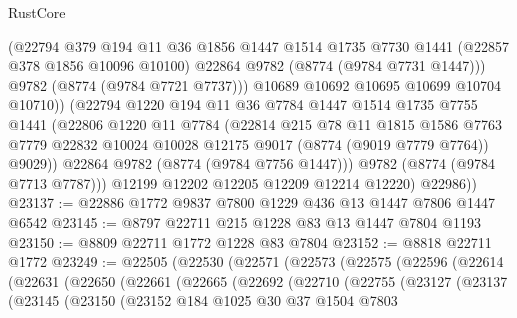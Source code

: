 \begin{lexlean}{RustCore}
\begin{coremodule}
                  (@22794
                    @379
                    @194
                    @11
                    @36
                    @1856
                    @1447
                    @1514
                    @1735
                    @7730
                    @1441
                    (@22857 @378 @1856 @10096 @10100)
                    @22864
                    @9782
                    (@8774 (@9784 @7731 @1447)))
                  @9782
                  (@8774 (@9784 @7721 @7737)))
                @10689
                @10692
                @10695
                @10699
                @10704
                @10710))
            (@22794
              @1220
              @194
              @11
              @36
              @7784
              @1447
              @1514
              @1735
              @7755
              @1441
              (@22806
                @1220
                @11
                @7784
                (@22814
                  @215
                  @78
                  @11
                  @1815
                  @1586
                  @7763
                  @7779
                  @22832
                  @10024
                  @10028
                  @12175
                  @9017
                  (@8774 (@9019 @7779 @7764))
                  @9029))
              @22864
              @9782
              (@8774 (@9784 @7756 @1447)))
            @9782
            (@8774 (@9784 @7713 @7787)))
          @12199
          @12202
          @12205
          @12209
          @12214
          @12220)
        @22986))
@23137 := @22886 @1772 @9837 @7800 @1229 @436 @13 @1447 @7806 @1447 @6542
@23145 := @8797 @22711 @215 @1228 @83 @13 @1447 @7804 @1193
@23150 := @8809 @22711 @1772 @1228 @83 @7804
@23152 := @8818 @22711 @1772
@23249 := @22505
    (@22530
      (@22571
        (@22573
          (@22575
            (@22596
              (@22614
                (@22631
                  (@22650
                    (@22661
                      (@22665
                        (@22692
                          (@22710
                            (@22755
                              (@23127
                                (@23137
                                  (@23145
                                    (@23150
                                      (@23152
                                        @184
                                        @1025
                                        @30
                                        @37
                                        @1504
                                        @7803

\end{coremodule}
\end{lexlean}
